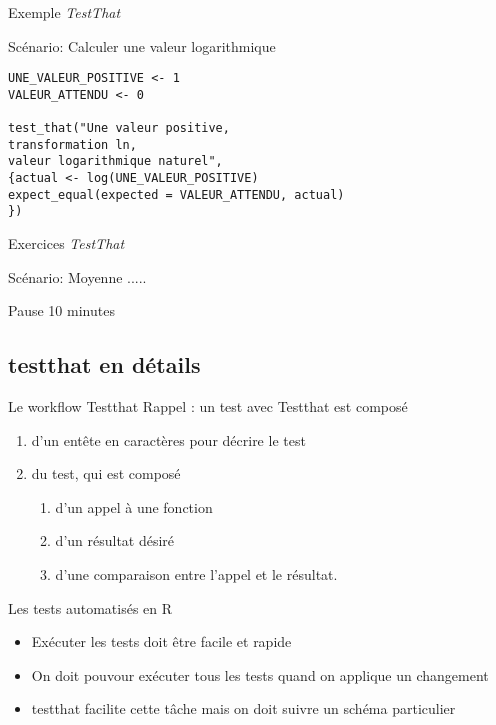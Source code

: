 \documentclass[11pt]{beamer}
\newcommand{\gotoR}[1]{%
	\begin{center}
		\colorbox{ulgold}{\color{black}
			\makebox[40mm][c]{%
				\makebox[5mm]{\raisebox{-1pt}{\large\faChevronCircleDown}}\;%
				{\ttfamily #1}}}
\end{center}}
\begin{document}
\begin{frame}[fragile]{Exemple \textit{TestThat}}
\begin{block}{Scénario: Calculer une valeur logarithmique}
\begin{lstlisting}
UNE_VALEUR_POSITIVE <- 1
VALEUR_ATTENDU <- 0

test_that("Une valeur positive, 
transformation ln, 
valeur logarithmique naturel",
{actual <- log(UNE_VALEUR_POSITIVE)
expect_equal(expected = VALEUR_ATTENDU, actual)
})
\end{lstlisting}
\end{block}
\end{frame}

\begin{frame}{Exercices \textit{TestThat}}
\begin{block}{Scénario: Moyenne .....}
\gotoR{introduction.R}
\end{block}
\end{frame}

\begin{frame}{Pause}
10 minutes
\end{frame}

\subsection{testthat en détails}

\begin{frame}{Le workflow Testthat}
Rappel : un test avec Testthat est composé

\begin{enumerate}
	\item d'un entête en caractères pour décrire le test
	\item du test, qui est composé
	\begin{enumerate}
		\item d'un appel à une fonction
		\item d'un résultat désiré
		\item d'une comparaison entre l'appel et le résultat. 
	\end{enumerate}
\end{enumerate}
\end{frame}

\begin{frame}{Les tests automatisés en R}
\begin{itemize}
\item Exécuter les tests doit être facile et rapide
\item On doit pouvour exécuter tous les tests quand on applique un changement
\item testthat facilite cette tâche mais on doit suivre un schéma particulier
\end{itemize}
\end{frame}
\end{document}
